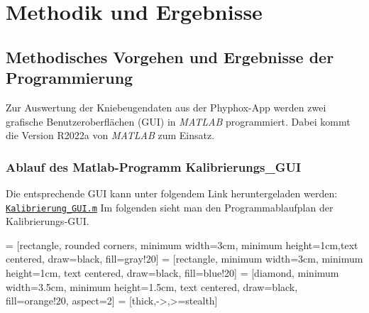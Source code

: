 \section{Methodik und Ergebnisse}
\subsection{Methodisches Vorgehen und Ergebnisse der Programmierung}
\noindent Zur Auswertung der Kniebeugendaten aus der Phyphox-App werden zwei grafische Benutzeroberflächen (GUI) in \textit{MATLAB} programmiert. Dabei kommt die Version R2022a von \textit{MATLAB} zum Einsatz.

\subsubsection{Ablauf des Matlab-Programm Kalibrierungs\_GUI}
Die entsprechende GUI kann unter folgendem Link heruntergeladen werden:
  \href{https://raw.githubusercontent.com/pia-GUI/Kalibrierungs-GUI/refs/heads/main/Kalibrierung_GUI.m?token=GHSAT0AAAAAADBPPXZYMYTFDYPMM6UFDB42Z7L2ZPQ}{\texttt{Kalibrierung\_GUI.m}}
Im folgenden sieht man den Programmablaufplan der Kalibrierungs-GUI.
\usetikzlibrary{shapes.geometric, arrows.meta, positioning}

 = [rectangle, rounded corners, minimum width=3cm, minimum height=1cm,text centered, draw=black, fill=gray!20]
 = [rectangle, minimum width=3cm, minimum height=1cm, text centered, draw=black, fill=blue!20]
 = [diamond, minimum width=3.5cm, minimum height=1.5cm, text centered, draw=black, fill=orange!20, aspect=2]
 = [thick,->,>=stealth]

